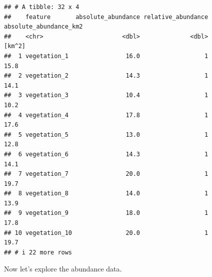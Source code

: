 \documentclass[
  12pt,
]{book}
\newenvironment{Shaded}{\begin{snugshade}}{\end{snugshade}}
\newcommand{\CommentTok}[1]{\textcolor[rgb]{0.56,0.35,0.01}{\textit{#1}}}
\newcommand{\DecValTok}[1]{\textcolor[rgb]{0.00,0.00,0.81}{#1}}
\newcommand{\FunctionTok}[1]{\textcolor[rgb]{0.00,0.00,0.00}{#1}}
\newcommand{\NormalTok}[1]{#1}
\newcommand{\OtherTok}[1]{\textcolor[rgb]{0.56,0.35,0.01}{#1}}
\newcommand{\SpecialCharTok}[1]{\textcolor[rgb]{0.00,0.00,0.00}{#1}}
\begin{document}
\begin{Shaded}
\end{Shaded}

\begin{verbatim}
## # A tibble: 32 x 4
##    feature       absolute_abundance relative_abundance absolute_abundance_km2
##    <chr>                      <dbl>              <dbl>                 [km^2]
##  1 vegetation_1                16.0                  1                   15.8
##  2 vegetation_2                14.3                  1                   14.1
##  3 vegetation_3                10.4                  1                   10.2
##  4 vegetation_4                17.8                  1                   17.6
##  5 vegetation_5                13.0                  1                   12.8
##  6 vegetation_6                14.3                  1                   14.1
##  7 vegetation_7                20.0                  1                   19.7
##  8 vegetation_8                14.0                  1                   13.9
##  9 vegetation_9                18.0                  1                   17.8
## 10 vegetation_10               20.0                  1                   19.7
## # i 22 more rows
\end{verbatim}

Now let's explore the abundance data.

\begin{Shaded}
\end{Shaded}
\end{document}
